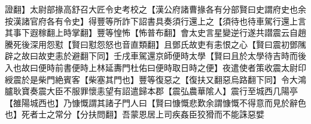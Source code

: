 證翻】太尉部掾高舒召大匠令史考校之【漢公府諸曹掾各有分部賢曰史謂府史也余按漢諸官府各有令史】得豐等所詐下詔書具奏須行還上之【須待也待車駕行還上言其事下遐稼翻上時掌翻】豐等惶怖【怖普布翻】會太史言星變逆行遂共譛震云自趙騰死後深用怨懟【賢曰懟怨怒也音直類翻】且鄧氏故吏有恚恨之心【賢曰震初鄧隲辟之故曰故吏恚於避翻下同】壬戌車駕還京師便時太學【賢曰且於太學待吉時而後入也故曰便時前書便時上林延夀門杜佑曰便時取日時之便】夜遣使者策收震太尉印綬震於是柴門絶賓客【柴塞其門也】豐等復惡之【復扶又翻惡烏路翻下同】令大鴻臚耿寶奏震大臣不服罪懷恚望有詔遣歸本郡【震弘農華隂人】震行至城西几陽亭【雒陽城西也】乃慷慨謂其諸子門人曰【賢曰慷慨悲歎余謂慷慨不得意而見於辭色也】死者士之常分【分扶問翻】吾蒙恩居上司疾姦臣狡猾而不能誅惡嬖